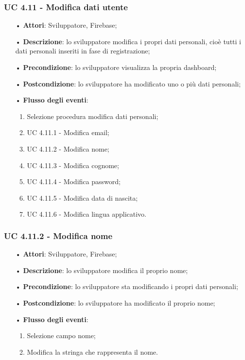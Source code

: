 \subsubsection{UC 4.11 - Modifica dati utente} 
\begin{itemize}
	\item[•]\textbf{Attori}: Sviluppatore, Firebase;
	\item[•]\textbf{Descrizione}: lo sviluppatore modifica i propri dati personali, cioè tutti i dati personali inseriti in fase di registrazione;
	\item[•]\textbf{Precondizione}: lo sviluppatore visualizza la propria dashboard;
	\item[•]\textbf{Postcondizione}: lo sviluppatore ha modificato uno o più dati personali; 
	\item[•]\textbf{Flusso degli eventi}: 
	\begin{enumerate}
		\item Selezione procedura modifica dati personali;
		\item UC 4.11.1 - Modifica email; 
		\item UC 4.11.2 - Modifica nome;
		\item UC 4.11.3 - Modifica cognome;
		\item UC 4.11.4 - Modifica password;
		\item UC 4.11.5 - Modifica data di nascita;
		\item UC 4.11.6 - Modifica lingua applicativo.
	\end{enumerate}
\end{itemize}
\subsubsection{UC 4.11.2 - Modifica nome}
\begin{itemize}
	\item[•]\textbf{Attori}: Sviluppatore, Firebase;
	\item[•]\textbf{Descrizione}: lo sviluppatore modifica il proprio nome;
	\item[•]\textbf{Precondizione}: lo sviluppatore sta modificando i propri dati personali;
	\item[•]\textbf{Postcondizione}: lo sviluppatore ha modificato il proprio nome; 
	\item[•]\textbf{Flusso degli eventi}: 
	\begin{enumerate}
		\item Selezione campo nome;
		\item Modifica la stringa che rappresenta il nome.
	\end{enumerate}
\end{itemize}
